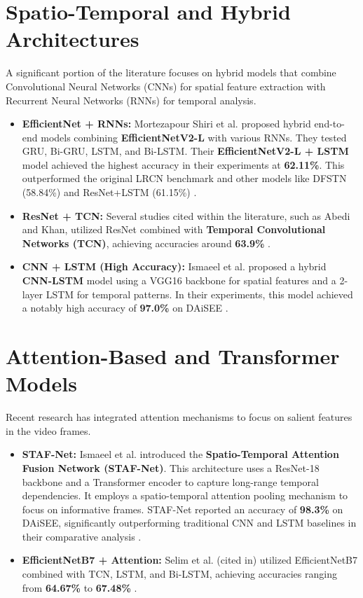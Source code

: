 \section{Spatio-Temporal and Hybrid Architectures}
\label{sec:spatio-temporal-and-hybrid-architectures}

A significant portion of the literature focuses on hybrid models that combine Convolutional Neural Networks (CNNs) for spatial feature extraction with Recurrent Neural Networks (RNNs) for temporal analysis.
\begin{itemize}
  \item{\textbf{EfficientNet + RNNs:} Mortezapour Shiri et al. proposed hybrid end-to-end models combining \textbf{EfficientNetV2-L} with various RNNs. They tested GRU, Bi-GRU, LSTM, and Bi-LSTM. Their \textbf{EfficientNetV2-L + LSTM} model achieved the highest accuracy in their experiments at \textbf{62.11\%}. This outperformed the original LRCN benchmark and other models like DFSTN (58.84\%) and ResNet+LSTM (61.15\%) \cite{Shiri2024DetectionOS}.}
  \item{\textbf{ResNet + TCN:} Several studies cited within the literature, such as Abedi and Khan, utilized ResNet combined with \textbf{Temporal Convolutional Networks (TCN)}, achieving accuracies around \textbf{63.9\%} \cite{Shiri2024DetectionOS} \cite{Malekshahi2024AGM}.}
  \item{\textbf{CNN + LSTM (High Accuracy):} Ismaeel et al. proposed a hybrid \textbf{CNN-LSTM} model using a VGG16 backbone for spatial features and a 2-layer LSTM for temporal patterns. In their experiments, this model achieved a notably high accuracy of \textbf{97.0\%} on DAiSEE \cite{Ismaeel2025DetectingSE}.}
\end{itemize}

\section{Attention-Based and Transformer Models}
\label{sec:attention-based-and-transformer-models}

Recent research has integrated attention mechanisms to focus on salient features in the video frames.
\begin{itemize}
  \item{\textbf{STAF-Net:} Ismaeel et al. introduced the \textbf{Spatio-Temporal Attention Fusion Network (STAF-Net)}. This architecture uses a ResNet-18 backbone and a Transformer encoder to capture long-range temporal dependencies. It employs a spatio-temporal attention pooling mechanism to focus on informative frames. STAF-Net reported an accuracy of \textbf{98.3\%} on DAiSEE, significantly outperforming traditional CNN and LSTM baselines in their comparative analysis \cite{2025STAFNetAS}.}
  \item{\textbf{EfficientNetB7 + Attention:} Selim et al. (cited in) utilized EfficientNetB7 combined with TCN, LSTM, and Bi-LSTM, achieving accuracies ranging from \textbf{64.67\%} to \textbf{67.48\%} \cite{Malekshahi2024AGM}.}
\end{itemize}

